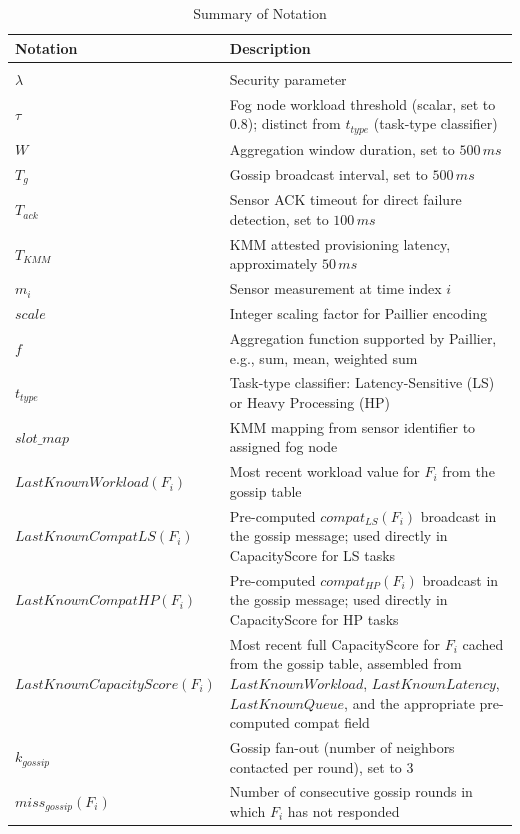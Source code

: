 \documentclass[conference]{IEEEtran}
\begin{document}
    \begin{table}[htbp]
    \caption{Summary of Notation}
    \label{table:notation}
    \centering
    \begingroup
    \small
    \setlength{\tabcolsep}{4pt}
    \renewcommand{\arraystretch}{1.08}
    \begin{tabular}{@{}>{\raggedright\arraybackslash}p{}>{\raggedright\arraybackslash}p{}@{}}
    \hline
    \textbf{Notation} & \textbf{Description} \\
    \hline

    \multicolumn{2}{l}{\textit{System Parameters}} \\

    $\lambda$ & Security parameter \\
    $\tau$ & Fog node workload threshold (scalar, set to 0.8); distinct from $t_{type}$ (task-type classifier) \\
    $W$ & Aggregation window duration, set to $500\,ms$ \\
    $T_g$ & Gossip broadcast interval, set to $500\,ms$ \\
    $T_{ack}$ & Sensor ACK timeout for direct failure detection, set to $100\,ms$ \\
    $T_{KMM}$ & KMM attested provisioning latency, approximately $50\,ms$ \\
    $m_i$ & Sensor measurement at time index $i$ \\
    $scale$ & Integer scaling factor for Paillier encoding \\
    $f$ & Aggregation function supported by Paillier, e.g., sum, mean, weighted sum \\
    $t_{type}$ & Task-type classifier: Latency-Sensitive (LS) or Heavy Processing (HP) \\
    $slot\_map$ & KMM mapping from sensor identifier to assigned fog node \\
    $LastKnownWorkload(F_i)$ & Most recent workload value for $F_i$ from the gossip table \\
    $LastKnownCompatLS(F_i)$ & Pre-computed $compat_{LS}(F_i)$ broadcast in the gossip message; used directly in CapacityScore for LS tasks \\
    $LastKnownCompatHP(F_i)$ & Pre-computed $compat_{HP}(F_i)$ broadcast in the gossip message; used directly in CapacityScore for HP tasks \\
    $LastKnownCapacityScore(F_i)$ & Most recent full CapacityScore for $F_i$ cached from the gossip table, assembled from $LastKnownWorkload$, $LastKnownLatency$, $LastKnownQueue$, and the appropriate pre-computed compat field \\
    $k_{gossip}$ & Gossip fan-out (number of neighbors contacted per round), set to 3 \\
    $miss_{gossip}(F_i)$ & Number of consecutive gossip rounds in which $F_i$ has not responded \\


\end{tabular}
\end{table}
\end{document}
